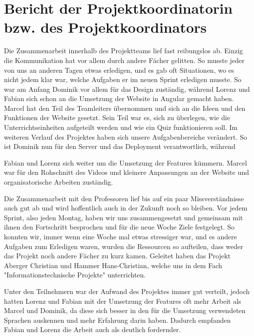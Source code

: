 \section{Bericht der Projektkoordinatorin bzw. des Projektkoordinators}

Die Zusammenarbeit innerhalb des Projektteams lief fast reibungslos ab. Einzig die Kommunikation hat vor allem durch andere Fächer gelitten. So musste jeder von uns an anderen Tagen etwas erledigen, und es gab oft Situationen, wo es nicht jedem klar war, welche Aufgaben er im neuen Sprint erledigen musste. So war am Anfang Dominik vor allem für das Design zuständig, während Lorenz und Fabian sich schon an die Umsetzung der Website in Angular gemacht haben. Marcel hat den Teil des Teamleiters übernommen und sich an die Ideen und den Funktionen der Website gesetzt. Sein Teil war es, sich zu überlegen, wie die Unterrichtseinheiten aufgeteilt werden und wie ein Quiz funktionieren soll. Im weiteren Verlauf des Projektes haben sich unsere Aufgabenbereiche verändert. So ist Dominik nun für den Server und das Deployment verantwortlich, während  

Fabian und Lorenz sich weiter um die Umsetzung der Features kümmern. Marcel war für den Rohschnitt des Videos und kleinere Anpassungen an der Website und organisatorische Arbeiten zuständig.  

   

Die Zusammenarbeit mit den Professoren lief bis auf ein paar Missverständnisse auch gut ab und wird hoffentlich auch in der Zukunft noch so bleiben. Vor jedem Sprint, also jeden Montag, haben wir uns zusammengesetzt und gemeinsam mit ihnen den Fortschritt besprochen und für die neue Woche Ziele festgelegt. So konnten wir, immer wenn eine Woche mal etwas stressiger war, und es andere Aufgaben zum Erledigen waren, wurden die Ressourcen so aufteilen, dass weder das Projekt noch andere Fächer zu kurz kamen. Geleitet haben das Projekt Aberger Christian und Hammer Hans-Christian, welche uns in dem Fach "Informationstechnische Projekte" unterrichten.  

   

Unter den Teilnehmern war der Aufwand des Projektes immer gut verteilt, jedoch hatten Lorenz und Fabian mit der Umsetzung der Features oft mehr Arbeit als Marcel und Dominik, da diese sich besser in den für die Umsetzung verwendeten Sprachen auskennen und mehr Erfahrung darin haben. Dadurch empfanden Fabian und Lorenz die Arbeit auch als deutlich fordernder.  

   

